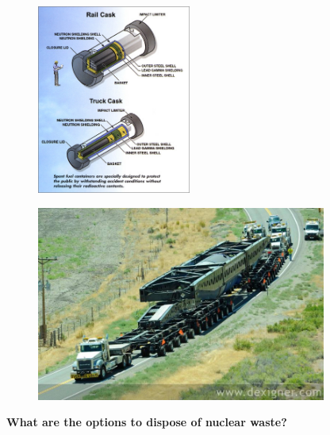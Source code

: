\documentclass[aspectratio=1610,pdftex,dvipsnames,compress,xcolor={dvipsnames}]{beamer}
\begin{document}
\begin{frame}{}
    \begin{figure}
        \centering
        \includegraphics[width=0.45\textwidth]{transport.casks.jpg}
    \end{figure}
\end{frame}


\begin{frame}{}
    \begin{figure}
        \centering
        \includegraphics[width=0.85\textwidth]{transport.jpg}
    \end{figure}
\end{frame}


\begin{frame}[plain]{}
    \centering\LARGE\textbf{What are the options to dispose of nuclear waste?}
\end{frame}
\end{document}
